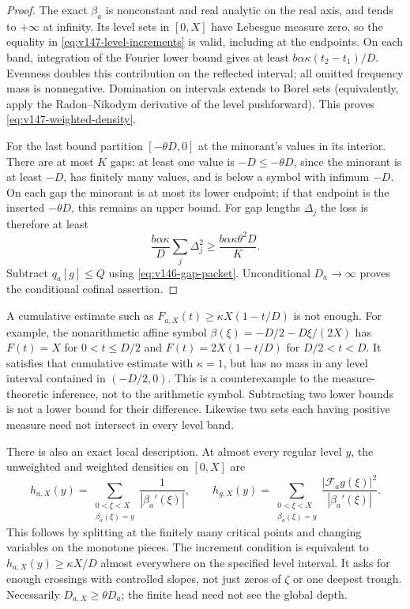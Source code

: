 \begin{proof}
The exact $\beta_a$ is nonconstant and real analytic on the real axis,
and tends to $+\infty$ at infinity. Its level sets in $[0,X]$ have
Lebesgue measure zero, so the equality in
\eqref{eq:v147-level-increments} is valid, including at the endpoints.
On each band, integration of the Fourier lower bound gives at least
$b\alpha\kappa(t_2-t_1)/D$. Evenness doubles this contribution on the
reflected interval; all omitted frequency mass is nonnegative.
Domination on intervals extends to Borel sets (equivalently, apply the
Radon--Nikodym derivative of the level pushforward). This proves
\eqref{eq:v147-weighted-density}.

For the last bound partition $[-\theta D,0]$ at the minorant's values
in its interior. There are at most $K$ gaps: at least one value is
$-D\le-\theta D$, since the minorant is at least $-D$, has finitely
many values, and is below a symbol with infimum $-D$. On each gap the
minorant is at most its lower endpoint; if that endpoint is the
inserted $-\theta D$, this remains an upper bound. For gap lengths
$\Delta_j$ the loss is therefore at least
\[
 \frac{b\alpha\kappa}{D}\sum_j\Delta_j^2
 \ge\frac{b\alpha\kappa\theta^2D}{K}.
\]
Subtract $q_a[g]\le Q$ using \eqref{eq:v146-gap-packet}.
Unconditional $D_a\to\infty$ proves the conditional cofinal assertion.
\end{proof}

A cumulative estimate such as
$F_{a,X}(t)\ge\kappa X(1-t/D)$ is not enough. For example, the
nonarithmetic affine symbol $\beta(\xi)=-D/2-D\xi/(2X)$ has
$F(t)=X$ for $0<t\le D/2$ and $F(t)=2X(1-t/D)$ for $D/2<t<D$.
It satisfies that cumulative estimate with $\kappa=1$, but has no
mass in any level interval contained in $(-D/2,0)$. This is a
counterexample to the measure-theoretic inference, not to the
arithmetic symbol. Subtracting two lower bounds is not a lower bound
for their difference. Likewise two sets each having positive measure
need not intersect in every level band.

There is also an exact local description. At almost every regular level
$y$, the unweighted and weighted densities on $[0,X]$ are
\begin{equation}\label{eq:v147-coarea}
 h_{a,X}(y)=\sum_{\substack{0<\xi<X\\\beta_a(\xi)=y}}
          \frac1{|\beta_a'(\xi)|},\qquad
 h_{g,X}(y)=\sum_{\substack{0<\xi<X\\\beta_a(\xi)=y}}
          \frac{|\mathcal F_ag(\xi)|^2}{|\beta_a'(\xi)|}.
\end{equation}
This follows by splitting at the finitely many critical points and
changing variables on the monotone pieces. The increment condition is
equivalent to $h_{a,X}(y)\ge\kappa X/D$ almost everywhere on the
specified level interval. It asks for enough crossings with controlled
slopes, not just zeros of $\zeta$ or one deepest trough. Necessarily
$D_{a,X}\ge\theta D_a$; the finite head need not see the global depth.

